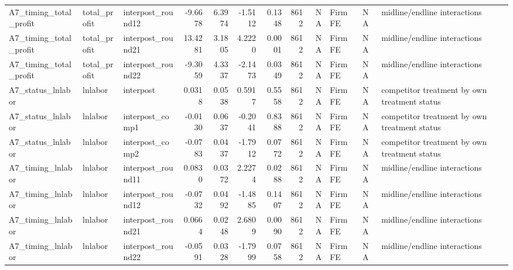 \begin{table}
\begin{tabular}[t]{lllrrrrrrlll}
A7\_timing\_total\_profit & total\_profit & interpost\_round12 & -9.6678 & 6.3974 & -1.5112 & 0.1348 & 8612 & NA & Firm FE & NA & midline/endline interactions\\
A7\_timing\_total\_profit & total\_profit & interpost\_round21 & 13.4281 & 3.1805 & 4.2220 & 0.0001 & 8612 & NA & Firm FE & NA & midline/endline interactions\\
A7\_timing\_total\_profit & total\_profit & interpost\_round22 & -9.3059 & 4.3337 & -2.1473 & 0.0349 & 8612 & NA & Firm FE & NA & midline/endline interactions\\
A7\_status\_lnlabor & lnlabor & interpost & 0.0318 & 0.0538 & 0.5917 & 0.5558 & 8612 & NA & Firm FE & NA & competitor treatment by own treatment status\\
\addlinespace
A7\_status\_lnlabor & lnlabor & interpost\_comp1 & -0.0130 & 0.0637 & -0.2041 & 0.8388 & 8612 & NA & Firm FE & NA & competitor treatment by own treatment status\\
A7\_status\_lnlabor & lnlabor & interpost\_comp2 & -0.0783 & 0.0437 & -1.7912 & 0.0772 & 8612 & NA & Firm FE & NA & competitor treatment by own treatment status\\
A7\_timing\_lnlabor & lnlabor & interpost\_round11 & 0.0830 & 0.0372 & 2.2274 & 0.0288 & 8612 & NA & Firm FE & NA & midline/endline interactions\\
A7\_timing\_lnlabor & lnlabor & interpost\_round12 & -0.0732 & 0.0492 & -1.4885 & 0.1407 & 8612 & NA & Firm FE & NA & midline/endline interactions\\
A7\_timing\_lnlabor & lnlabor & interpost\_round21 & 0.0664 & 0.0248 & 2.6809 & 0.0090 & 8612 & NA & Firm FE & NA & midline/endline interactions\\
\addlinespace
A7\_timing\_lnlabor & lnlabor & interpost\_round22 & -0.0591 & 0.0328 & -1.7999 & 0.0758 & 8612 & NA & Firm FE & NA & midline/endline interactions\\
\bottomrule
\end{tabular}
\end{table}
